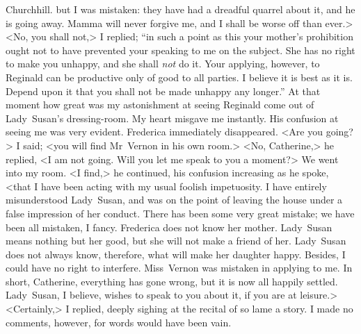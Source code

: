 \begin{mail}{Churchhill.}{}
but I was mistaken: they have had a dreadful quarrel about it, and he is going away. Mamma will never forgive me, and I shall be worse off than ever.> <No, you shall not,> I replied; “in such a point as this your mother's prohibition ought not to have prevented your speaking to me on the subject. She has no right to make you unhappy, and she shall \textit{not} do it. Your applying, however, to Reginald can be productive only of good to all parties. I believe it is best as it is. Depend upon it that you shall not be made unhappy any longer.” At that moment how great was my astonishment at seeing Reginald come out of Lady~Susan's dressing-room. My heart misgave me instantly. His confusion at seeing me was very evident. Frederica immediately disappeared. <Are you going?> I said; <you will find Mr~Vernon in his own room.> <No, Catherine,> he replied, <I am not going. Will you let me speak to you a moment?> We went into my room. <I find,> he continued, his confusion increasing as he spoke, <that I have been acting with my usual foolish impetuosity. I have entirely misunderstood Lady~Susan, and was on the point of leaving the house under a false impression of her conduct. There has been some very great mistake; we have been all mistaken, I fancy. Frederica does not know her mother. Lady~Susan means nothing but her good, but she will not make a friend of her. Lady~Susan does not always know, therefore, what will make her daughter happy. Besides, I could have no right to interfere. Miss~Vernon was mistaken in applying to me. In short, Catherine, everything has gone wrong, but it is now all happily settled. Lady~Susan, I believe, wishes to speak to you about it, if you are at leisure.> <Certainly,> I replied, deeply sighing at the recital of so lame a story. I made no comments, however, for words would have been vain.


\end{mail}
